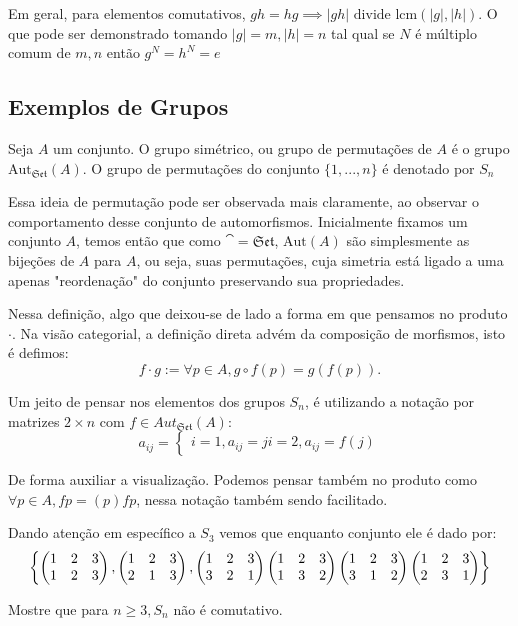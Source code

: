 \documentclass[../main]{subfiles}
\begin{document}
Em geral, para elementos comutativos, \(gh = hg \implies |gh| \text{ divide
lcm}(|g|, |h|)\). O que pode ser demonstrado tomando \(|g| = m, |h| = n\) tal
qual se \(N\) é múltiplo comum de \(m, n\) então \(g^N = h^N = e\)

\subsection{Exemplos de Grupos}
\begin{definition}
    Seja \(A\) um conjunto. O grupo simétrico, ou grupo de permutações  de \(A\)
    é o grupo \(\text{Aut}_{\mathfrak{Set}}(A)\). O grupo de permutações do
    conjunto \(\{1, ..., n\}\) é denotado por \(S_n\)
\end{definition}

Essa ideia de permutação pode ser observada mais claramente, ao observar o
comportamento desse conjunto de automorfismos. Inicialmente fixamos um conjunto
\(A\), temos então que como \(\cat = \mathfrak{Set}\), \(\text{Aut}(A)\) são
simplesmente as bijeções de \(A\) para \(A\), ou seja, suas permutações, cuja
simetria está ligado a uma apenas "reordenação" do conjunto preservando sua
propriedades. 

Nessa definição, algo que deixou-se de lado a forma em que pensamos no produto
\(\cdot\). Na visão categorial, a definição direta advém da composição de
morfismos, isto é defimos:
\[f \cdot g := \forall p \in A, g \circ f(p) = g(f(p)).\]

Um jeito de pensar nos elementos dos grupos \(S_n\), é utilizando a notação por
matrizes \(2 \times n\) com \(f \in Aut_{\mathfrak{Set}}(A)\):
\[a_{ij} = \begin{cases} i = 1, a_{ij} = j i = 2, a_{ij} = f(j) \end{cases}\]

De forma auxiliar a visualização. Podemos pensar também no produto como
\(\forall p \in A, fp = (p)fp\), nessa notação também sendo facilitado. 

Dando atenção em específico a \(S_3\) vemos que enquanto conjunto ele é dado
por:
\begin{align*}
    \left \{ \begin{pmatrix} 1 & 2 & 3 \\ 1 & 2 & 3 \end{pmatrix}, \begin{pmatrix} 1 & 2 & 3 \\ 2 & 1 & 3 \end{pmatrix}, \begin{pmatrix} 1 & 2 & 3 \\ 3 & 2 & 1 \end{pmatrix} \begin{pmatrix} 1 & 2 & 3 \\ 1 & 3 & 2 \end{pmatrix} \begin{pmatrix} 1 & 2 & 3 \\ 3 & 1 & 2 \end{pmatrix} \begin{pmatrix} 1 & 2 & 3 \\ 2 & 3 & 1 \end{pmatrix} \right \}
\end{align*}
\begin{exercise}
    Mostre que para \(n \geq 3, S_n\) não é comutativo.
\end{exercise}
\end{document}
